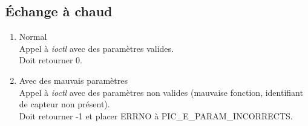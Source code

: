 \subsection{Échange à chaud}

        \begin{enumerate}
            \item Normal\\
Appel à \textsl{ioctl} avec des paramètres valides.\\
Doit retourner 0.
            \item Avec des mauvais paramètres\\
Appel à \textsl{ioctl} avec des paramètres non valides (mauvaise fonction, identifiant de capteur non présent).\\
Doit retourner -1 et placer ERRNO à PIC\_E\_PARAM\_INCORRECTS.
        \end{enumerate}
\vfill
\pagebreak
